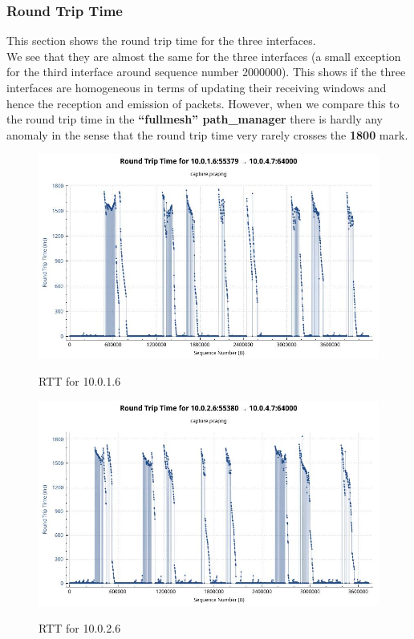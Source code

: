 \documentclass[a4paper,11pt]{article}
\begin{document}
			\subsubsection{Round Trip Time}
			\label{subsubsec:rtt}
			This section shows the round trip time for the three interfaces. \\
			We see that they are almost the same for the three interfaces (a small exception for the third interface around sequence number 2000000). This shows if the three interfaces are homogeneous in terms of updating their receiving windows and hence the reception and emission of packets. However, when we compare this to the round trip time in the \textbf{``fullmesh'' path\_manager} there is hardly any anomaly in the sense that the round trip time very rarely crosses the \textbf{1800} mark.
			\begin{figure}[h!]
				\begin{center}
					\label{fig:rtt1}
					\includegraphics[scale=0.45]{pictures/rtt1.jpeg}
					\caption[]{RTT for 10.0.1.6}
				\end{center}
			\end{figure}
			\begin{figure}[h!]
				\begin{center}
					\label{fig:rtt2}
					\includegraphics[scale=0.45]{pictures/rtt2.jpeg}
					\caption[]{RTT for 10.0.2.6}
				\end{center}
			\end{figure}
\end{document}
